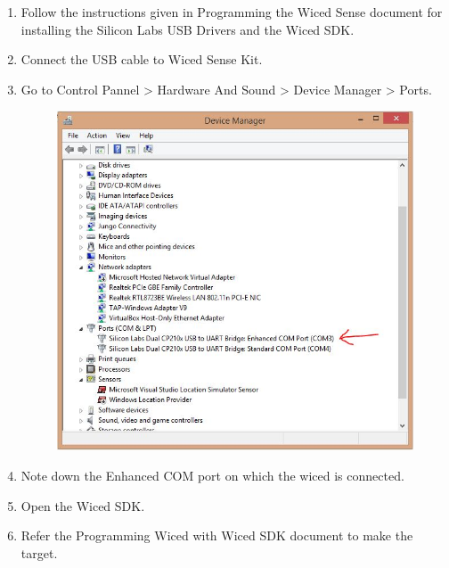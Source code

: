 \documentclass[11pt,a4paper]{article}
\begin{document}
\begin{enumerate}
	  \item Follow the instructions given in Programming the Wiced Sense document for installing the Silicon Labs USB Drivers and the Wiced SDK.
	  \item Connect the USB cable to Wiced Sense Kit.
	  
	  \newpage
	  \item Go to Control Pannel > Hardware And Sound > Device Manager > Ports.
	  
	  \begin{figure}[h]
        \centering
    	\includegraphics[scale=0.5]{comport.JPG}
	    \end{figure}
	    
	  \item Note down the Enhanced COM port on which the wiced is connected.
    \item Open the Wiced SDK.
	\item Refer the Programming Wiced with Wiced SDK document to make the target.
	

\end{enumerate}
\end{document}
